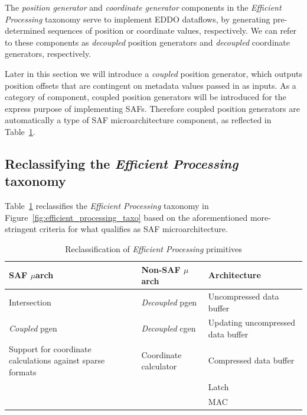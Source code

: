The \textit{position generator} and \textit{coordinate generator} components in the \textit{Efficient Processing} taxonomy serve to implement EDDO dataflows, by generating pre-determined sequences of position or coordinate values, respectively. We can refer to these components as \textit{decoupled} position generators and \textit{decoupled} coordinate generators, respectively.

Later in this section we will introduce a \textit{coupled} position generator, which outputs position offsets that are contingent on metadata values passed in as inputs. As a category of component, coupled position generators will be introduced for the express purpose of implementing SAFs. Therefore coupled position generators are automatically a type of SAF microarchitecture component, as reflected in Table~\ref{tab:reclassify_saf_microarchitecture}.

\subsection{Reclassifying the \textit{Efficient Processing} taxonomy}

Table~\ref{tab:reclassify_saf_microarchitecture} reclassifies the \textit{Efficient Processing} taxonomy in Figure~\ref{fig:efficient_processing_taxo} based on the aforementioned more-stringent criteria for what qualifies as SAF microarchitecture.

\begin{table}
\centering
\caption{Reclassification of \textit{Efficient Processing}\cite{szebook} primitives}
\label{tab:reclassify_saf_microarchitecture}
\begin{tabular}{||p{}|l|l||}\hline
\textbf{SAF $\mu$arch} & \textbf{Non-SAF $\mu$arch} & \textbf{Architecture}  \\\hline
Intersection & \textit{Decoupled} pgen & Uncompressed data buffer \\\hline
\textit{Coupled} pgen & \textit{Decoupled} cgen & Updating uncompressed data buffer \\\hline
Support for coordinate calculations against sparse formats & Coordinate calculator & Compressed data buffer \\\hline
 &  & Latch \\\hline
 &  & MAC \\\hline
\end{tabular}
\end{table}

